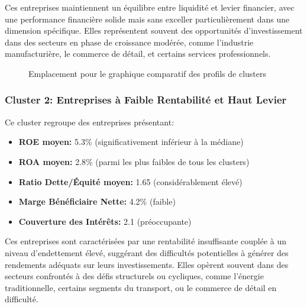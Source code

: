 \documentclass[12pt]{article}
\begin{document}
Ces entreprises maintiennent un équilibre entre liquidité et levier financier, avec une performance financière solide mais sans exceller particulièrement dans une dimension spécifique. Elles représentent souvent des opportunités d'investissement dans des secteurs en phase de croissance modérée, comme l'industrie manufacturière, le commerce de détail, et certains services professionnels.

\begin{figure}[H]
    \centering
    \caption{Emplacement pour le graphique comparatif des profils de clusters}
    \label{fig:cluster_profiles}
\end{figure}

\subsubsection{Cluster 2: Entreprises à Faible Rentabilité et Haut Levier}
Ce cluster regroupe des entreprises présentant:
\begin{itemize}
    \item \textbf{ROE moyen:} 5.3\% (significativement inférieur à la médiane)
    \item \textbf{ROA moyen:} 2.8\% (parmi les plus faibles de tous les clusters)
    \item \textbf{Ratio Dette/Équité moyen:} 1.65 (considérablement élevé)
    \item \textbf{Marge Bénéficiaire Nette:} 4.2\% (faible)
    \item \textbf{Couverture des Intérêts:} 2.1 (préoccupante)
\end{itemize}

Ces entreprises sont caractérisées par une rentabilité insuffisante couplée à un niveau d'endettement élevé, suggérant des difficultés potentielles à générer des rendements adéquats sur leurs investissements. Elles opèrent souvent dans des secteurs confrontés à des défis structurels ou cycliques, comme l'énergie traditionnelle, certains segments du transport, ou le commerce de détail en difficulté.
\end{document}
